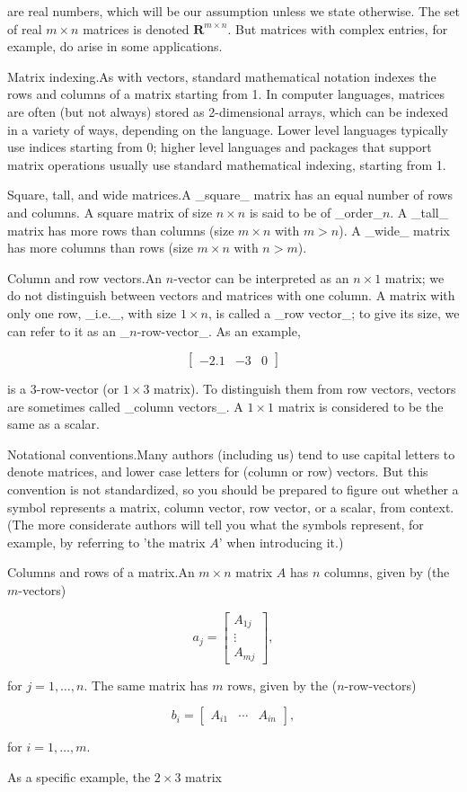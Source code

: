 are real numbers, which will be our assumption unless we state otherwise. The set of real \(m\times n\) matrices is denoted \(\mathbf{R}^{m\times n}\). But matrices with complex entries, for example, do arise in some applications.

Matrix indexing.As with vectors, standard mathematical notation indexes the rows and columns of a matrix starting from 1. In computer languages, matrices are often (but not always) stored as 2-dimensional arrays, which can be indexed in a variety of ways, depending on the language. Lower level languages typically use indices starting from 0; higher level languages and packages that support matrix operations usually use standard mathematical indexing, starting from 1.

Square, tall, and wide matrices.A _square_ matrix has an equal number of rows and columns. A square matrix of size \(n\times n\) is said to be of _order_\(n\). A _tall_ matrix has more rows than columns (size \(m\times n\) with \(m>n\)). A _wide_ matrix has more columns than rows (size \(m\times n\) with \(n>m\)).

Column and row vectors.An \(n\)-vector can be interpreted as an \(n\times 1\) matrix; we do not distinguish between vectors and matrices with one column. A matrix with only one row, _i.e._, with size \(1\times n\), is called a _row vector_; to give its size, we can refer to it as an _\(n\)-row-vector_. As an example,

\[\left[\begin{array}{ccc}-2.1&-3&0\end{array}\right]\]

is a 3-row-vector (or \(1\times 3\) matrix). To distinguish them from row vectors, vectors are sometimes called _column vectors_. A \(1\times 1\) matrix is considered to be the same as a scalar.

Notational conventions.Many authors (including us) tend to use capital letters to denote matrices, and lower case letters for (column or row) vectors. But this convention is not standardized, so you should be prepared to figure out whether a symbol represents a matrix, column vector, row vector, or a scalar, from context. (The more considerate authors will tell you what the symbols represent, for example, by referring to 'the matrix \(A\)' when introducing it.)

Columns and rows of a matrix.An \(m\times n\) matrix \(A\) has \(n\) columns, given by (the \(m\)-vectors)

\[a_{j}=\left[\begin{array}{c}A_{1j}\\ \vdots\\ A_{mj}\end{array}\right],\]

for \(j=1,\ldots,n\). The same matrix has \(m\) rows, given by the (\(n\)-row-vectors)

\[b_{i}=\left[\begin{array}{cc}A_{i1}&\cdots&A_{in}\end{array}\right],\]

for \(i=1,\ldots,m\).

As a specific example, the \(2\times 3\) matrix 